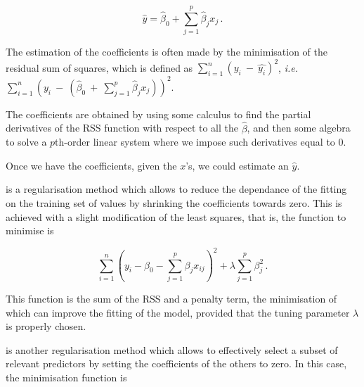 \documentclass[../main.tex]{subfiles}
\begin{document}
\begin{equation}
	\hat{y} = \hat{\beta}_0 + \sum_{j=1}^{p}\hat{\beta}_j x_j\,.
\end{equation}

The estimation of the coefficients is often made by the minimisation of 
the residual sum of squares, which is defined as 
$\sum_{i=1}^{n}(y_i~-~\hat{y_i})^2$, \textit{i.e.}\ 
$\sum_{i=1}^{n}(y_i~-~(\hat{\beta}_0~+~\sum_{j=1}^{p}\hat{\beta}_jx_j))^2$.

The coefficients are obtained by using some calculus to find the partial 
derivatives of the RSS function with respect to all the $\hat{\beta}$, 
and then some algebra to solve a $p$th-order linear system where we 
impose such derivatives equal to $0$.

Once we have the coefficients, given the $x$'s, we could estimate an 
$\hat{y}$.

 is a regularisation method 
which allows to reduce the dependance of the fitting on the training set 
of values by shrinking the coefficients towards zero. This is achieved 
with a slight modification of the least squares, that is, the function 
to minimise is

\begin{equation}
	\sum_{i=1}^{n}\left(y_i-\beta_0-\sum_{j=1}^{p}\beta_jx_{ij}\right)^2+
		\lambda\sum_{j=1}^{p}\beta_j^2\,.
\end{equation}

This function is the sum of the RSS and a penalty term, the minimisation 
of which can improve the fitting of the model, provided that the tuning 
parameter $\lambda$ is properly chosen.

 is another regularisation 
method which allows to effectively select a subset of relevant 
predictors by setting the coefficients of the others to zero. In this 
case, the minimisation function is
\end{document}
